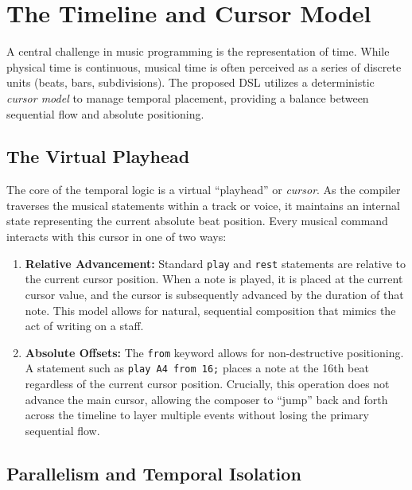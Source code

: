 \section{The Timeline and Cursor Model}\label{sec:temporal-logic}

A central challenge in music programming is the representation of time.
While physical time is continuous, musical time is often perceived as a series of discrete units (beats, bars,
subdivisions).
The proposed DSL utilizes a deterministic \textit{cursor model} to manage temporal placement, providing a balance
between sequential flow and absolute positioning.

\subsection{The Virtual Playhead}\label{subsec:the-virtual-playhead}

The core of the temporal logic is a virtual ``playhead'' or \textit{cursor}.
As the compiler traverses the musical statements within a track or voice, it maintains an internal state representing
the current absolute beat position.
Every musical command interacts with this cursor in one of two ways:

\begin{enumerate}
  \item \textbf{Relative Advancement:} Standard \texttt{play} and \texttt{rest} statements are relative to the current
    cursor position.
    When a note is played, it is placed at the current cursor value, and the cursor is subsequently advanced by the
    duration of that note.
    This model allows for natural, sequential composition that mimics the act of writing on a staff.
  \item \textbf{Absolute Offsets:} The \texttt{from} keyword allows for non-destructive positioning.
    A statement such as \texttt{play A4 from 16;} places a note at the 16th beat regardless of the current cursor
    position.
    Crucially, this operation does not advance the main cursor, allowing the composer to ``jump'' back and forth across
    the timeline to layer multiple events without losing the primary sequential flow.
\end{enumerate}

\subsection{Parallelism and Temporal Isolation}\label{subsec:parallelism-and-temporal-isolation}

